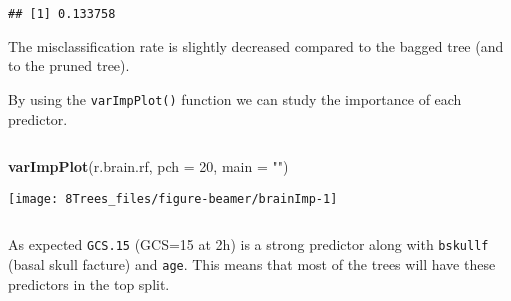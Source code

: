 \documentclass[10pt,ignorenonframetext,]{beamer}
\newenvironment{Shaded}{\begin{snugshade}}{\end{snugshade}}
\newcommand{\DataTypeTok}[1]{\textcolor[rgb]{0.13,0.29,0.53}{#1}}
\newcommand{\DecValTok}[1]{\textcolor[rgb]{0.00,0.00,0.81}{#1}}
\newcommand{\KeywordTok}[1]{\textcolor[rgb]{0.13,0.29,0.53}{\textbf{#1}}}
\newcommand{\NormalTok}[1]{#1}
\newcommand{\StringTok}[1]{\textcolor[rgb]{0.31,0.60,0.02}{#1}}
\begin{document}
\begin{frame}[fragile]
\begin{verbatim}
## [1] 0.133758
\end{verbatim}

\normalsize

The misclassification rate is slightly decreased compared to the bagged
tree (and to the pruned tree).

\end{frame}

\begin{frame}[fragile]

By using the \texttt{varImpPlot()} function we can study the importance
of each predictor.

\(~\)

\scriptsize

\begin{Shaded}
\begin{Highlighting}[]
\KeywordTok{varImpPlot}\NormalTok{(r.brain.rf, }\DataTypeTok{pch =} \DecValTok{20}\NormalTok{, }\DataTypeTok{main =} \StringTok{""}\NormalTok{)}
\end{Highlighting}
\end{Shaded}

\begin{center}\texttt{[image: 8Trees\_files/figure-beamer/brainImp-1]} \end{center}

\normalsize

\(~\)

As expected \texttt{GCS.15} (GCS=15 at 2h) is a strong predictor along
with \texttt{bskullf} (basal skull facture) and \texttt{age}. This means
that most of the trees will have these predictors in the top split.

\end{frame}
\end{document}
